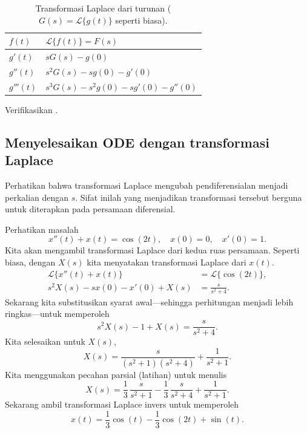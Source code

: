\begin{table}[h!t]
\mybeginframe
\capstart
\begin{center}
\begin{tabular}{@{}ll@{}}
\toprule
$f(t)$ & $\mathcal{L} \bigl\{ f(t) \bigr\} = F(s)$ \\
\midrule
$g'(t)$ & $sG(s)-g(0)$ \\[4pt]
$g''(t)$ & $s^2G(s)-sg(0)-g'(0)$ \\[4pt]
$g'''(t)$ & $s^3G(s)-s^2g(0)-sg'(0)-g''(0)$ \\[4pt]
\bottomrule
\end{tabular}
\end{center}
\caption{Transformasi Laplace dari turunan
($G(s) = \mathcal{L} \bigl\{ g(t) \bigr\}$
seperti biasa).\label{ltd:table}}
\myendframe
\end{table}

\begin{exercise}
Verifikasikan .
\end{exercise}

\subsection{Menyelesaikan ODE dengan transformasi Laplace}

Perhatikan bahwa transformasi Laplace mengubah pendiferensialan menjadi
perkalian dengan $s$.
Sifat inilah yang menjadikan transformasi tersebut berguna untuk diterapkan 
pada persamaan diferensial.

\begin{example}
Perhatikan masalah
\begin{equation*}
x''(t) + x(t) = \cos (2t), \quad x(0) = 0, \quad x'(0) = 1 .
\end{equation*}
Kita akan mengambil transformasi Laplace dari kedua ruas persamaan.
Seperti biasa, dengan $X(s)$ kita menyatakan transformasi Laplace dari
$x(t)$.
\begin{align*}
\mathcal{L} \bigl\{ x''(t) + x(t) \bigr\} & = \mathcal{L} \bigl\{ \cos (2t) \bigr\} , \\
s^2 X(s) -sx(0)-x'(0) + X(s) & = \frac{s}{s^2 + 4} .
\end{align*}
Sekarang kita substitusikan syarat awal---sehingga perhitungan menjadi lebih
ringkas---untuk memperoleh
\begin{equation*}
s^2 X(s) -1 + X(s) = \frac{s}{s^2 + 4} .
\end{equation*}
Kita selesaikan untuk $X(s)$,
\begin{equation*}
X(s) = \frac{s}{(s^2+1)(s^2 + 4)} + \frac{1}{s^2+1} .
\end{equation*}
Kita menggunakan pecahan parsial (latihan) untuk menulis
\begin{equation*}
X(s) =\frac{1}{3} \, \frac{s}{s^2+1} - 
\frac{1}{3}\, \frac{s}{s^2+4} + \frac{1}{s^2+1} .
\end{equation*}
Sekarang ambil transformasi Laplace invers untuk memperoleh
\begin{equation*}
x(t) =\frac{1}{3}  \cos (t) -
\frac{1}{3} \cos (2t) + \sin (t) .
\end{equation*}
\end{example}

